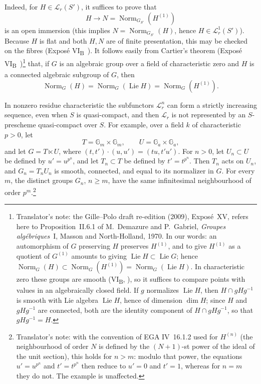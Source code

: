 Indeed, for \(H\in\mathcal L_r(S')\), it suffices to prove that
\[
  H\longrightarrow N=\operatorname{Norm}_{G_{S'}}(H^{(1)})
\]
is an open immersion (this implies \(N=\operatorname{Norm}_{G_{S'}}(H)\), hence
\(H\in\mathcal L_r^1(S')\)). Because \(H\) is flat and both \(H,N\) are of
finite presentation, this may be checked on the fibres (Exposé
VI\textsubscript{B}~). It follows easily from Cartier's theorem (Exposé
VI\textsubscript{B}~)\footnote{Translator's note: the Gille--Polo draft re-edition (2009), Exposé~XV, refers here to Proposition~II.6.1 of M.~Demazure and P.~Gabriel, \emph{Groupes algébriques}~I, Masson and North-Holland, 1970. In our words: an automorphism of \(G\) preserving \(H\) preserves \(H^{(1)}\), and to give \(H^{(1)}\) as a quotient of \(G^{(1)}\) amounts to giving \(\operatorname{Lie}H\subset\operatorname{Lie}G\); hence \(\operatorname{Norm}_G(H)\subset\operatorname{Norm}_G(H^{(1)})=\operatorname{Norm}_G(\operatorname{Lie}H)\). In characteristic zero these groups are smooth (VI\textsubscript{B}, ), so it suffices to compare points with values in an algebraically closed field. If \(g\) normalizes \(\operatorname{Lie}H\), then \(H\cap gHg^{-1}\) is smooth with Lie algebra \(\operatorname{Lie}H\), hence of dimension \(\dim H\); since \(H\) and \(gHg^{-1}\) are connected, both are the identity component of \(H\cap gHg^{-1}\), so that \(gHg^{-1}=H\).} that, if \(G\) is an algebraic group over a field of characteristic zero and \(H\) is a
connected algebraic subgroup of \(G\), then
\[
 \operatorname{Norm}_G(H)
 =\operatorname{Norm}_G(\operatorname{Lie}H)
 =\operatorname{Norm}_G(H^{(1)}).
\]

In nonzero residue characteristic the subfunctors
\(\mathcal L_r^n\) can form a strictly increasing sequence, even when
\(S\) is quasi-compact, and then \(\mathcal L_r\) is not represented
by an \(S\)-prescheme quasi-compact over \(S\). For example, over a
field \(k\) of characteristic \(p>0\), let
\[
 T=\mathbb G_m\times\mathbb G_m,\qquad
 U=\mathbb G_a\times\mathbb G_a,
\]
and let \(G=T\ltimes U\), where
\((t,t')\cdot(u,u')=(tu,t'u')\). For \(n>0\), let \(U_n\subset U\)
be defined by \(u'=u^{p^n}\), and let \(T_n\subset T\) be defined by
\(t'=t^{p^n}\). Then \(T_n\) acts on \(U_n\), and
\(G_n=T_nU_n\) is smooth, connected, and equal to its normalizer in
\(G\). For every \(m\), the distinct groups \(G_n\), \(n\geq m\),
have the same infinitesimal neighbourhood of order \(p^m\).\footnote{Translator's note: with the convention of EGA IV~16.1.2 used for \(H^{(n)}\) (the neighbourhood of order \(N\) is defined by the \((N+1)\)-st power of the ideal of the unit section), this holds for \(n>m\): modulo that power, the equations \(u'=u^{p^n}\) and \(t'=t^{p^n}\) then reduce to \(u'=0\) and \(t'=1\), whereas for \(n=m\) they do not. The example is unaffected.}


